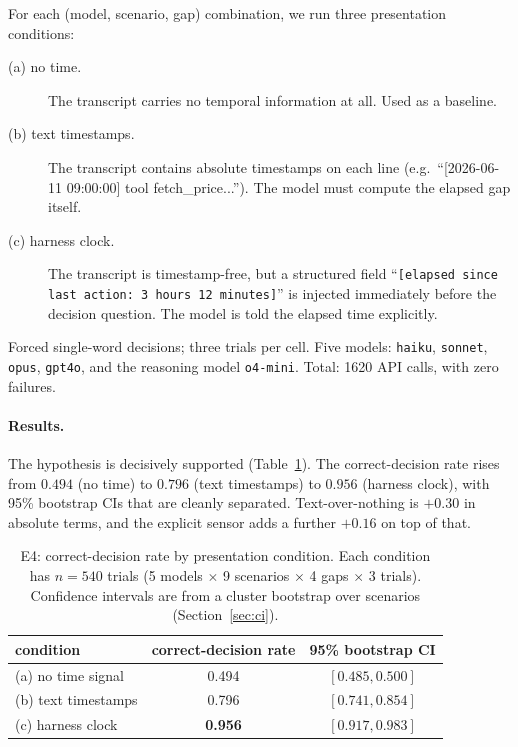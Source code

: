 \documentclass[11pt]{article}
\newcommand{\code}[1]{\texttt{\small #1}}
\begin{document}
For each (model, scenario, gap) combination, we run three presentation conditions:

\begin{description}
\item[(a) no time.] The transcript carries no temporal information at all. Used as a
baseline.
\item[(b) text timestamps.] The transcript contains absolute timestamps on each line (e.g.\
``[2026-06-11 09:00:00] tool fetch\_price...''). The model must compute the elapsed gap
itself.
\item[(c) harness clock.] The transcript is timestamp-free, but a structured field
``\code{[elapsed since last action: 3 hours 12 minutes]}'' is injected immediately before the
decision question. The model is told the elapsed time explicitly.
\end{description}

Forced single-word decisions; three trials per cell. Five models: \code{haiku},
\code{sonnet}, \code{opus}, \code{gpt4o}, and the reasoning model \code{o4-mini}. Total: 1620
API calls, with zero failures.

\paragraph{Results.} The hypothesis is decisively supported (Table~\ref{tab:e4}). The
correct-decision rate rises from $0.494$ (no time) to $0.796$ (text timestamps) to $0.956$
(harness clock), with 95\% bootstrap CIs that are cleanly separated. Text-over-nothing is
$+0.30$ in absolute terms, and the explicit sensor adds a further $+0.16$ on top of that.

\begin{table}[h]
\centering
\caption{E4: correct-decision rate by presentation condition. Each condition has $n = 540$
trials (5 models $\times$ 9 scenarios $\times$ 4 gaps $\times$ 3 trials). Confidence intervals
are from a cluster bootstrap over scenarios (Section~\ref{sec:ci}).}
\label{tab:e4}
\begin{tabular}{@{}lcc@{}}
\toprule
condition          & correct-decision rate & 95\% bootstrap CI \\
\midrule
(a) no time signal     & 0.494 & $[0.485, 0.500]$ \\
(b) text timestamps    & 0.796 & $[0.741, 0.854]$ \\
(c) harness clock      & \textbf{0.956} & $[0.917, 0.983]$ \\
\bottomrule
\end{tabular}
\end{table}
\end{document}
